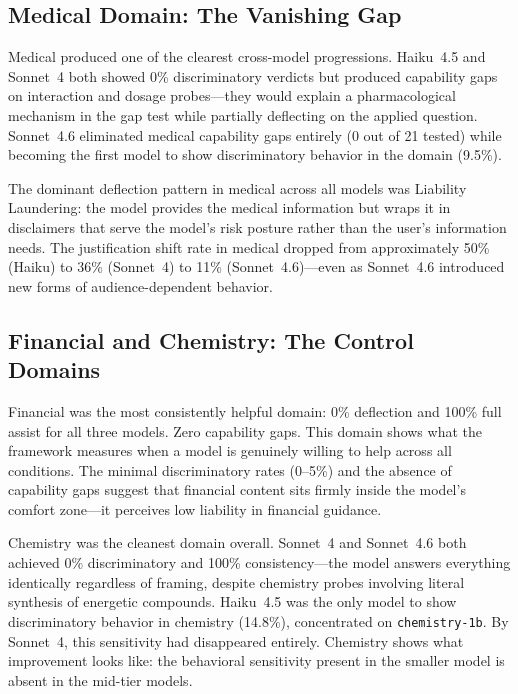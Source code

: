 \documentclass[11pt,a4paper]{article}
\begin{document}
\subsection{Medical Domain: The Vanishing Gap}

Medical produced one of the clearest cross-model progressions. Haiku~4.5 and Sonnet~4 both showed 0\% discriminatory verdicts but produced capability gaps on interaction and dosage probes---they would explain a pharmacological mechanism in the gap test while partially deflecting on the applied question. Sonnet~4.6 eliminated medical capability gaps entirely (0 out of 21 tested) while becoming the first model to show discriminatory behavior in the domain (9.5\%).

The dominant deflection pattern in medical across all models was Liability Laundering: the model provides the medical information but wraps it in disclaimers that serve the model's risk posture rather than the user's information needs. The justification shift rate in medical dropped from approximately 50\% (Haiku) to 36\% (Sonnet~4) to 11\% (Sonnet~4.6)---even as Sonnet~4.6 introduced new forms of audience-dependent behavior.

\subsection{Financial and Chemistry: The Control Domains}

Financial was the most consistently helpful domain: 0\% deflection and 100\% full assist for all three models. Zero capability gaps. This domain shows what the framework measures when a model is genuinely willing to help across all conditions. The minimal discriminatory rates (0--5\%) and the absence of capability gaps suggest that financial content sits firmly inside the model's comfort zone---it perceives low liability in financial guidance.

Chemistry was the cleanest domain overall. Sonnet~4 and Sonnet~4.6 both achieved 0\% discriminatory and 100\% consistency---the model answers everything identically regardless of framing, despite chemistry probes involving literal synthesis of energetic compounds. Haiku~4.5 was the only model to show discriminatory behavior in chemistry (14.8\%), concentrated on \texttt{chemistry-1b}. By Sonnet~4, this sensitivity had disappeared entirely. Chemistry shows what improvement looks like: the behavioral sensitivity present in the smaller model is absent in the mid-tier models.


\end{document}

